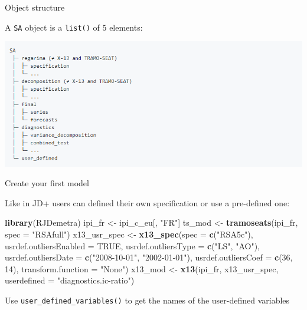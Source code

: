 \documentclass[10pt,xcolor=table,color={dvipsnames,usenames},ignorenonframetext,usepdftitle=false,french]{beamer}
\newenvironment{Shaded}{\begin{snugshade}}{\end{snugshade}}
\newcommand{\DataTypeTok}[1]{\textcolor[rgb]{0.13,0.29,0.53}{#1}}
\newcommand{\DecValTok}[1]{\textcolor[rgb]{0.00,0.00,0.81}{#1}}
\newcommand{\KeywordTok}[1]{\textcolor[rgb]{0.13,0.29,0.53}{\textbf{#1}}}
\newcommand{\NormalTok}[1]{#1}
\newcommand{\OtherTok}[1]{\textcolor[rgb]{0.56,0.35,0.01}{#1}}
\newcommand{\StringTok}[1]{\textcolor[rgb]{0.31,0.60,0.02}{#1}}
\begin{document}
\begin{frame}[fragile]{Object structure}
\protect\hypertarget{object-structure}{}

A \texttt{SA} object is a \texttt{list()} of 5 elements:

\includegraphics{img/sa_obj_struct.png}

\end{frame}

\begin{frame}[fragile]{Create your first model}
\protect\hypertarget{create-your-first-model}{}

Like in JD+ users can defined their own specification or use a
pre-defined one:

\footnotesize

\begin{Shaded}
\begin{Highlighting}[]
\KeywordTok{library}\NormalTok{(RJDemetra)}
\NormalTok{ipi_fr <-}\StringTok{ }\NormalTok{ipi_c_eu[, }\StringTok{"FR"}\NormalTok{]}
\NormalTok{ts_mod <-}\StringTok{ }\KeywordTok{tramoseats}\NormalTok{(ipi_fr, }\DataTypeTok{spec =} \StringTok{"RSAfull"}\NormalTok{)}
\NormalTok{x13_usr_spec <-}\StringTok{ }\KeywordTok{x13_spec}\NormalTok{(}\DataTypeTok{spec =} \KeywordTok{c}\NormalTok{(}\StringTok{"RSA5c"}\NormalTok{),}
                         \DataTypeTok{usrdef.outliersEnabled =} \OtherTok{TRUE}\NormalTok{,}
                         \DataTypeTok{usrdef.outliersType =} \KeywordTok{c}\NormalTok{(}\StringTok{"LS"}\NormalTok{, }\StringTok{"AO"}\NormalTok{),}
                         \DataTypeTok{usrdef.outliersDate =} \KeywordTok{c}\NormalTok{(}\StringTok{"2008-10-01"}\NormalTok{,}
                                                 \StringTok{"2002-01-01"}\NormalTok{),}
                         \DataTypeTok{usrdef.outliersCoef =} \KeywordTok{c}\NormalTok{(}\DecValTok{36}\NormalTok{, }\DecValTok{14}\NormalTok{),}
                         \DataTypeTok{transform.function =} \StringTok{"None"}\NormalTok{)}
\NormalTok{x13_mod <-}\StringTok{ }\KeywordTok{x13}\NormalTok{(ipi_fr, x13_usr_spec, }\DataTypeTok{userdefined =} \StringTok{"diagnostics.ic-ratio"}\NormalTok{)}
\end{Highlighting}
\end{Shaded}

Use \texttt{user\_defined\_variables()} to get the names of the
user-defined variables

\end{frame}
\end{document}

